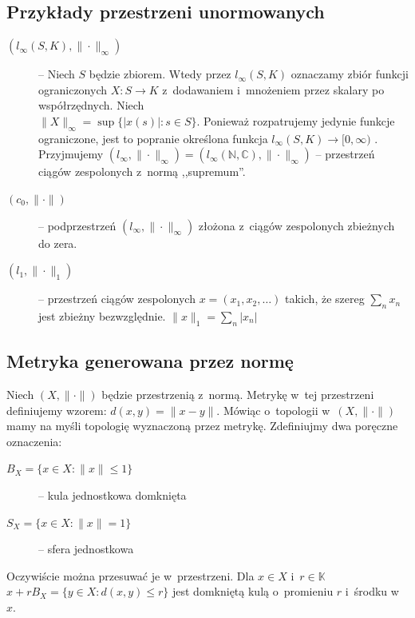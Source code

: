 \documentclass[11pt]{mwrep}
\renewcommand{\[}{\begin{equation}}
\renewcommand{\]}{\end{equation}}
\newcommand{\N}{{\ensuremath{\mathbb N}}}
\newcommand{\C}{{\ensuremath{\mathbb C}}}
\newcommand{\K}{\ensuremath{\mathbb{K}}}
\newcounter{numer}
\begin{document}
\subsection{Przykłady przestrzeni unormowanych} 
\begin{description}
 	 \item[$( l_\infty(S,K), \|\cdot \|_\infty)$] -- Niech $S$ będzie zbiorem. Wtedy przez $l_\infty (S,K)$ oznaczamy zbiór funkcji ograniczonych $X\colon S\to K$ 
		z~dodawaniem i~mnożeniem przez skalary po współrzędnych.
		Niech\\ $\|X\|_\infty = \sup \{|x(s)|\colon s\in S\}$. Ponieważ rozpatrujemy jedynie funkcje ograniczone, jest to popranie określona funkcja $l_\infty (S,K)\to [0,\infty)$ .
		Przyjmujemy $(l_\infty, \|\cdot\|_\infty) = ( l_\infty(\N,\C), \|\cdot\|_\infty )$ 
		-- przestrzeń ciągów zespolonych z~normą ,,supremum''.
	  \item[$(c_0, \|\cdot\|)$] -- podprzestrzeń $(l_\infty, \|\cdot \|_\infty )$ złożona z~ciągów zespolonych zbieżnych do zera.
	  \item[$(l_1, \|\cdot\|_1)$] -- przestrzeń ciągów zespolonych $x= (x_1,x_2,\ldots)$ takich, że szereg $\sum_n x _n$ jest zbieżny  
		bezwzględnie. $\|x\| _1 = \sum_n |x_n|$
\end{description}
 \subsection{Metryka generowana przez normę }
 Niech  $(X,\|\cdot\|)$ będzie przestrzenią z~normą. Metrykę w~tej przestrzeni definiujemy  wzorem: $d(x,y) = \|x-y\|$.
Mówiąc o~topologii w~$(X,\|\cdot\|)$ mamy na myśli topologię wyznaczoną przez metrykę.
Zdefiniujmy dwa poręczne oznaczenia:
\begin{description}
  \item[$B_X = \{ x\in X: \|x\|\le 1\} $] -- kula jednostkowa domknięta
  \item[$S_X = \{ x \in X : \|x\| = 1 \}$] -- sfera jednostkowa 
\end{description}
Oczywiście można przesuwać je w~przestrzeni. Dla $x\in X$ i~$r\in \K$ 
$x+rB_X = \{ y \in X: d(x,y) \le r\}$ jest domkniętą kulą o~promieniu $r$ i~środku w~$x$. 
\end{document}
